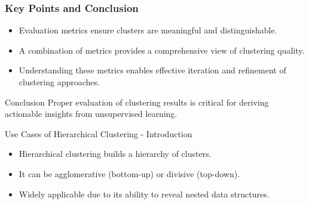 \documentclass[aspectratio=169]{beamer}
\begin{document}
\begin{frame}[fragile]
    \frametitle{Key Points and Conclusion}
    \begin{itemize}
        \item Evaluation metrics ensure clusters are meaningful and distinguishable.
        \item A combination of metrics provides a comprehensive view of clustering quality.
        \item Understanding these metrics enables effective iteration and refinement of clustering approaches.
    \end{itemize}
    
    \begin{block}{Conclusion}
        Proper evaluation of clustering results is critical for deriving actionable insights from unsupervised learning.
    \end{block}
\end{frame}

\begin{frame}[fragile]{Use Cases of Hierarchical Clustering - Introduction}
    \begin{itemize}
        \item Hierarchical clustering builds a hierarchy of clusters.
        \item It can be agglomerative (bottom-up) or divisive (top-down).
        \item Widely applicable due to its ability to reveal nested data structures.
    \end{itemize}
\end{frame}
\end{document}
